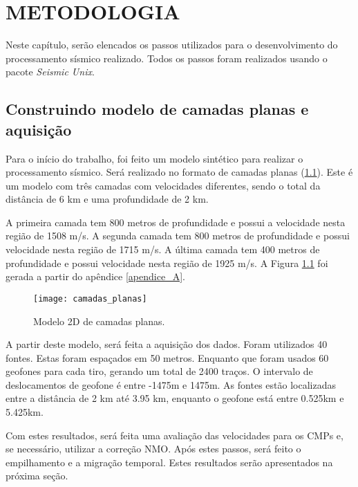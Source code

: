 \chapter{METODOLOGIA}
\label{cap3}

Neste capítulo, serão elencados os passos utilizados para o desenvolvimento do processamento sísmico realizado. Todos os passos foram realizados usando o pacote \textit{Seismic Unix}.

\section{Construindo modelo de camadas planas e aquisição}

Para o início do trabalho,  foi feito um modelo sintético para realizar o processamento sísmico. Será realizado no formato de camadas planas (\ref{fig:camadas}). Este é um modelo com três camadas com velocidades diferentes, sendo o total da distância de 6 km e uma profundidade de 2 km.

A primeira camada tem 800 metros de profundidade e possui a velocidade nesta região de 1508 m/s. A segunda camada tem 800 metros de profundidade e possui  velocidade nesta região de 1715 m/s. A última camada tem 400 metros de profundidade e possui velocidade nesta região de 1925 m/s. A Figura \ref{fig:camadas} foi gerada a partir do apêndice \ref{apendice_A}.

\begin{figure}[ht!]
	\centering
	\texttt{[image: camadas\_planas]}
	\caption{Modelo 2D de camadas planas.} \label{fig:camadas}
\end{figure} 

A partir deste modelo, será feita a aquisição dos dados. Foram utilizados 40 fontes. Estas foram espaçados em 50 metros. Enquanto que foram usados 60 geofones para cada tiro, gerando um total de 2400 traços. O  intervalo de deslocamentos de geofone é entre -1475m
e 1475m. As fontes estão localizadas entre a distância de 2 km até 3.95 km, enquanto o geofone está entre 0.525km e 5.425km.
 
 Com estes resultados, será feita uma avaliação das velocidades para os CMPs e, se necessário, utilizar a correção NMO. Após estes passos, será feito o empilhamento e a migração temporal. Estes resultados serão apresentados na próxima seção.
